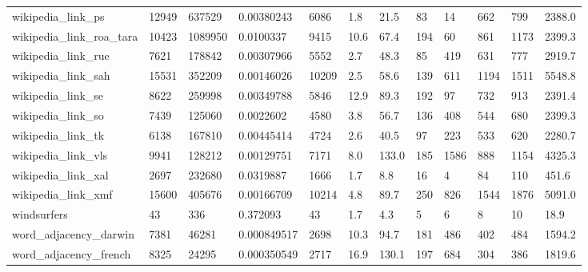 \begin{longtable}{llllllllllll}
 wikipedia\_link\_ps                                  & 12949      & 637529    & 0.00380243  & 6086  & 1.8    & 21.5   & 83    & 14     & 662    & 799    & 2388.0  \\
 wikipedia\_link\_roa\_tara                            & 10423      & 1089950   & 0.0100337   & 9415  & 10.6   & 67.4   & 194   & 60     & 861    & 1173   & 2399.3  \\
 wikipedia\_link\_rue                                 & 7621       & 178842    & 0.00307966  & 5552  & 2.7    & 48.3   & 85    & 419    & 631    & 777    & 2919.7  \\
 wikipedia\_link\_sah                                 & 15531      & 352209    & 0.00146026  & 10209 & 2.5    & 58.6   & 139   & 611    & 1194   & 1511   & 5548.8  \\
 wikipedia\_link\_se                                  & 8622       & 259998    & 0.00349788  & 5846  & 12.9   & 89.3   & 192   & 97     & 732    & 913    & 2391.4  \\
 wikipedia\_link\_so                                  & 7439       & 125060    & 0.0022602   & 4580  & 3.8    & 56.7   & 136   & 408    & 544    & 680    & 2399.3  \\
 wikipedia\_link\_tk                                  & 6138       & 167810    & 0.00445414  & 4724  & 2.6    & 40.5   & 97    & 223    & 533    & 620    & 2280.7  \\
 wikipedia\_link\_vls                                 & 9941       & 128212    & 0.00129751  & 7171  & 8.0    & 133.0  & 185   & 1586   & 888    & 1154   & 4325.3  \\
 wikipedia\_link\_xal                                 & 2697       & 232680    & 0.0319887   & 1666  & 1.7    & 8.8    & 16    & 4      & 84     & 110    & 451.6   \\
 wikipedia\_link\_xmf                                 & 15600      & 405676    & 0.00166709  & 10214 & 4.8    & 89.7   & 250   & 826    & 1544   & 1876   & 5091.0  \\
 windsurfers                                        & 43         & 336       & 0.372093    & 43    & 1.7    & 4.3    & 5     & 6      & 8      & 10     & 18.9    \\
 word\_adjacency\_darwin                              & 7381       & 46281     & 0.000849517 & 2698  & 10.3   & 94.7   & 181   & 486    & 402    & 484    & 1594.2  \\
 word\_adjacency\_french                              & 8325       & 24295     & 0.000350549 & 2717  & 16.9   & 130.1  & 197   & 684    & 304    & 386    & 1819.6  \\

\end{longtable}
